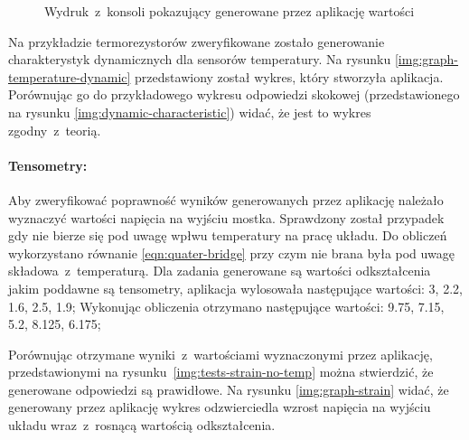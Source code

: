 \begin{figure}[!htbp]
  \hfill
  \hfill
  \hfill
  \caption{\label{img:calc-console-temperature}Wydruk~z~konsoli pokazujący generowane przez
    aplikację wartości}
\end{figure}

Na przykładzie termorezystorów zweryfikowane zostało generowanie charakterystyk dynamicznych dla
sensorów temperatury. Na rysunku \ref{img:graph-temperature-dynamic} przedstawiony został wykres,
który stworzyła aplikacja. Porównując go do przykładowego wykresu odpowiedzi skokowej
(przedstawionego na rysunku \ref{img:dynamic-characteristic}) widać, że jest to wykres
zgodny~z~teorią.


\paragraph{Tensometry:} Aby zweryfikować poprawność wyników generowanych przez aplikację należało
wyznaczyć wartości napięcia na wyjściu mostka. Sprawdzony został przypadek gdy nie bierze się pod
uwagę wpłwu temperatury na pracę układu. Do obliczeń wykorzystano równanie \ref{eqn:quater-bridge}
przy czym nie brana była pod uwagę składowa~z~temperaturą. Dla zadania generowane są wartości
odkształcenia jakim poddawne są tensometry, aplikacja wylosowała następujące wartości: 3, 2.2,
1.6, 2.5, 1.9; Wykonując obliczenia otrzymano następujące wartości: 9.75, 7.15, 5.2, 8.125, 6.175;

Porównując otrzymane wyniki~z~wartościami wyznaczonymi przez aplikację, przedstawionymi na
rysunku~\ref{img:tests-strain-no-temp} można stwierdzić, że generowane odpowiedzi są prawidłowe.
Na rysunku \ref{img:graph-strain} widać, że generowany przez aplikację wykres odzwierciedla wzrost
napięcia na wyjściu układu wraz~z~rosnącą wartością odkształcenia.


